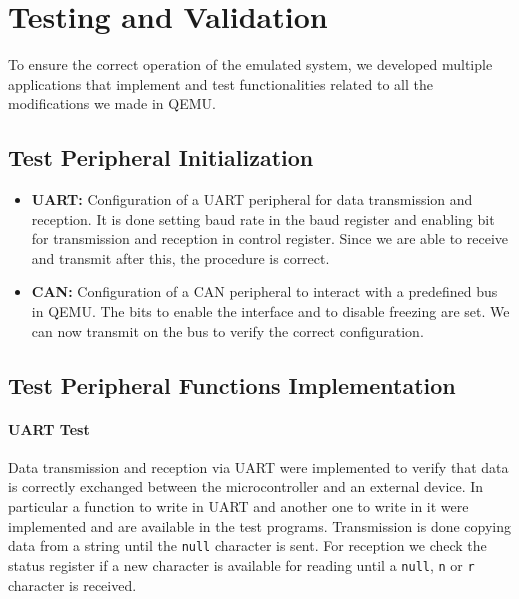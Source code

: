 \section{Testing and Validation}
To ensure the correct operation of the emulated system, we developed multiple applications that implement and test functionalities related to all the modifications we made in QEMU.


\subsection{Test Peripheral Initialization}

\begin{itemize}
    \item \textbf{UART:} Configuration of a UART peripheral for data transmission and reception. It is done setting baud rate in the baud register and enabling bit for transmission and reception in control register. Since we are able to receive and transmit after this, the procedure is correct.
    \item \textbf{CAN:} Configuration of a CAN peripheral to interact with a predefined bus in QEMU. The bits to enable the interface and to disable freezing are set. We can now transmit on the bus to verify the correct configuration.
\end{itemize}


\subsection{Test Peripheral Functions Implementation}

\paragraph{UART Test}

Data transmission and reception via UART were implemented to verify that data is correctly exchanged between the microcontroller and an external device. In particular a function to write in UART and another one to write in it were implemented and are available in the test programs. Transmission is done copying data from a string until the \texttt{null} character is sent. For reception we check the status register if a new character is available for reading until a \texttt{null}, \texttt{n} or \texttt{r} character is received.

